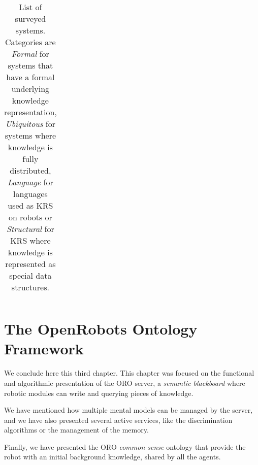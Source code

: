 \begin{landscape}
\begin{table}
\begin{center}
\begin{tabular}{p{2.2cm}p{1.6cm}p{4cm}lp{2.4cm}p{3.4cm}p{1.5cm}}

\bottomrule

\end{tabular}
\end{center}

\caption{List of surveyed systems. Categories are \emph{Formal} for systems
that have a formal underlying knowledge representation, \emph{Ubiquitous} for
systems where knowledge is fully distributed, \emph{Language} for languages
used as KRS on robots or \emph{Structural} for KRS where knowledge is
represented as special data structures.}

\label{table|surveyed-systems}
\end{table}
\end{landscape}



\section{The OpenRobots Ontology Framework}


We conclude here this third chapter. This chapter was focused on the functional
and algorithmic presentation of the ORO server, a \emph{semantic blackboard}
where robotic modules can write and querying pieces of knowledge.

We have mentioned how multiple mental models can be managed by the server, and
we have also presented several active services, like the discrimination
algorithms or the management of the memory.

Finally, we have presented the ORO \emph{common-sense} ontology that provide
the robot with an initial background knowledge, shared by all the agents.

